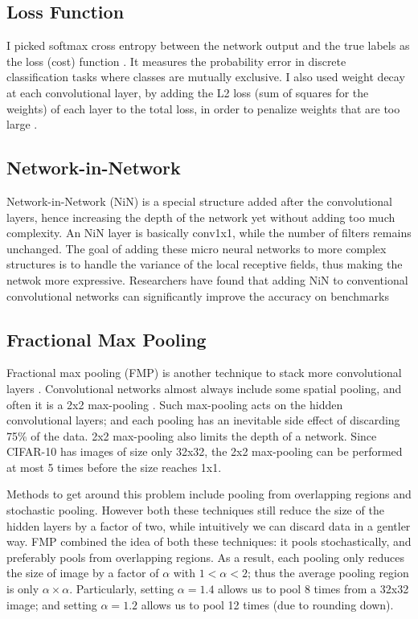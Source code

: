 \documentclass[conference]{IEEEtran}
\begin{document}
\subsection*{Loss Function}
I picked softmax cross entropy between the network output and the true labels as the loss (cost) function \cite{cross}. It measures the probability error in discrete classification tasks where classes are mutually exclusive. I also used weight decay at each convolutional layer, by adding the L2 loss (sum of squares for the weights) of each layer to the total loss, in order to penalize weights that are too large \cite{decay}.

\subsection*{Network-in-Network}
Network-in-Network (NiN) is a special structure added after the convolutional layers, hence increasing the depth of the network yet without adding too much complexity\cite{nin}. An NiN layer is basically conv1x1, while the number of filters remains unchanged. The goal of adding these micro neural networks to more complex structures is to handle the variance of the local receptive fields, thus making the netwok more expressive. Researchers have found that adding NiN to conventional convolutional networks can significantly improve the accuracy on benchmarks\cite{sparse,fmp,nin}

\subsection*{Fractional Max Pooling}
Fractional max pooling (FMP) is another technique to stack more convolutional layers \cite{fmp}. Convolutional networks almost always include some spatial pooling, and often it is a 2x2 max-pooling \cite{conv}. Such max-pooling acts on the hidden convolutional layers; and each pooling has an inevitable side effect of discarding 75\% of the data. 2x2 max-pooling also limits the depth of a network. Since CIFAR-10 has images of size only 32x32, the 2x2 max-pooling can be performed at most 5 times before the size reaches 1x1.

Methods to get around this problem include pooling from overlapping regions and stochastic pooling\cite{fmp}. However both these techniques still reduce the size of the hidden layers by a factor of two, while intuitively we can discard data in a gentler way. FMP combined the idea of both these techniques: it pools stochastically, and preferably pools from overlapping regions. As a result, each pooling only reduces the size of image by a factor of $\alpha$ with $1 < \alpha < 2$; thus the average pooling region is only $\alpha \times \alpha$\cite{fmp}. Particularly, setting $\alpha =1.4$ allows us to pool $8$ times from a 32x32 image; and setting $\alpha=1.2$ allows us to pool 12 times (due to rounding down). 
\end{document}
